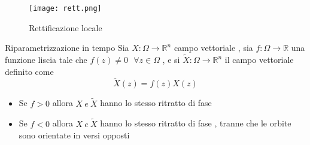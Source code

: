 \documentclass{article}
\theoremstyle{definition}
\newcommand{\R}{\mathbb{R}}
\newcommand{\Rn}{\R^n}
\begin{document}
 \begin{figure}[h]
 	\centering 
 \texttt{[image: rett.png]}
 \caption{Rettificazione locale}
 \end{figure}
 \begin{teo}{Riparametrizzazione in tempo }{}
 	Sia $X :\Omega \rightarrow \Rn $ campo vettoriale , sia $f: \Omega \rightarrow \R$ una funzione liscia tale che $f(z) \neq 0	\ \  \  \forall z \in \Omega $ , e si $\widetilde{X}: \Omega \rightarrow \Rn $ il campo vettoriale definito come $$\widetilde{X}(z)=f(z)X(z)$$ 
 	\begin{itemize}
 		\item Se $f > 0 $ allora $X \ e \ \widetilde{X}$ hanno lo stesso ritratto di fase 
 		 		\item Se $f < 0 $ allora $X \ e \ \widetilde{X}$ hanno lo stesso ritratto di fase , tranne che le orbite sono orientate in versi opposti 
 	\end{itemize}
 \end{teo}
 \newpage 
\end{document}
